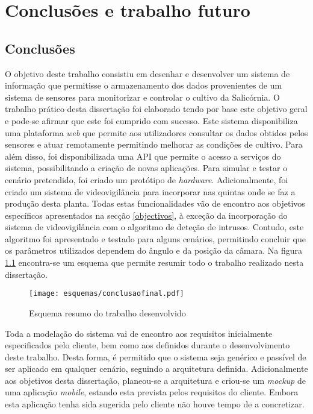 \chapter{Conclusões e trabalho futuro}


\section{Conclusões}



O objetivo deste trabalho consistiu em desenhar e desenvolver um sistema de informação que permitisse o armazenamento dos dados provenientes de um sistema de sensores para monitorizar e controlar o cultivo da Salicórnia. O trabalho prático desta dissertação foi elaborado tendo por base este objetivo geral e pode-se afirmar que este foi cumprido com sucesso. Este sistema disponibiliza uma plataforma \textit{web} que permite aos utilizadores consultar os dados obtidos pelos sensores e atuar remotamente permitindo melhorar as condições de cultivo. Para além disso, foi disponibilizada uma \ac{API} que permite o acesso a serviços do sistema, possibilitando a criação de novas aplicações. Para simular e testar o cenário pretendido, foi criado um protótipo de \textit{hardware}. Adicionalmente, foi criado um sistema de videovigilância para incorporar nas quintas onde se faz a produção desta planta. Todas estas funcionalidades vão de encontro aos objetivos específicos apresentados na secção \ref{objectivos}, à exceção da incorporação do sistema de videovigilância com o algoritmo de deteção de intrusos. Contudo, este algoritmo foi apresentado e testado para alguns cenários, permitindo concluir que os parâmetros utilizados dependem do ângulo e da posição da câmara.  Na figura \ref{resumo} encontra-se um esquema que permite resumir todo o trabalho realizado nesta dissertação. 

\begin{figure}[h]
	\centering
	\texttt{[image: esquemas/conclusaofinal.pdf]}
	\caption{Esquema resumo do trabalho desenvolvido}
	\label{resumo}
\end{figure}



Toda a modelação do sistema vai de encontro aos requisitos inicialmente especificados pelo cliente, bem como aos definidos durante o desenvolvimento deste trabalho. Desta forma, é permitido que o sistema seja genérico e passível de ser aplicado em qualquer cenário, seguindo a arquitetura definida. Adicionalmente aos objetivos desta dissertação, planeou-se a arquitetura e criou-se um \textit{mockup} de uma aplicação \textit{mobile}, estando esta prevista pelos requisitos do cliente. Embora esta aplicação tenha sida sugerida pelo cliente não houve tempo de a concretizar. 



